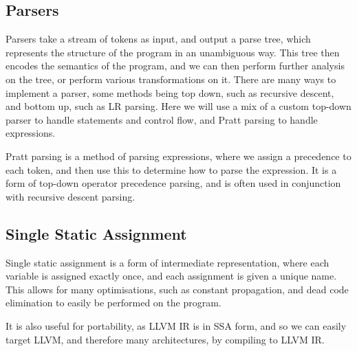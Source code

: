 \subsection*{Parsers}\label{subsec:parsers}
Parsers take a stream of tokens as input, and output a parse tree, which represents the structure of the program in an unambiguous way.
This tree then encodes the semantics of the program, and we can then perform further analysis on the tree, or perform various transformations on it.
There are many ways to implement a parser, some methods being top down, such as recursive descent, and bottom up, such as LR parsing\cite{KnuthLRParsing}.
Here we will use a mix of a custom top-down parser to handle statements and control flow, and Pratt parsing to handle expressions\cite{PrattParsing}.

Pratt parsing is a method of parsing expressions, where we assign a precedence to each token, and then use this to determine how to parse the expression.
It is a form of top-down operator precedence parsing, and is often used in conjunction with recursive descent parsing.

\subsection*{Single Static Assignment}\label{subsec:ssa}
Single static assignment is a form of intermediate representation, where each variable is assigned exactly once, and each assignment is given a unique name.
This allows for many optimisations, such as constant propagation, and dead code elimination to easily be performed on the program\cite{SSA, RSSA}.

It is also useful for portability, as LLVM IR is in SSA form, and so we can easily target LLVM, and therefore many architectures, by compiling to LLVM IR.

